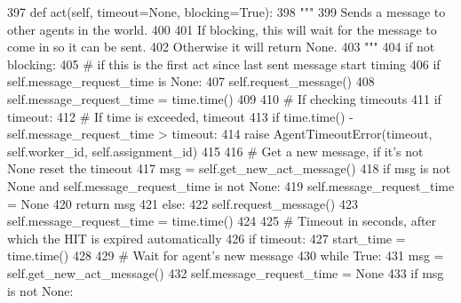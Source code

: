 \begin{DoxyCode}
397     \textcolor{keyword}{def }act(self, timeout=None, blocking=True):
398         \textcolor{stringliteral}{"""}
399 \textcolor{stringliteral}{        Sends a message to other agents in the world.}
400 \textcolor{stringliteral}{}
401 \textcolor{stringliteral}{        If blocking, this will wait for the message to come in so it can be sent.}
402 \textcolor{stringliteral}{        Otherwise it will return None.}
403 \textcolor{stringliteral}{        """}
404         \textcolor{keywordflow}{if} \textcolor{keywordflow}{not} blocking:
405             \textcolor{comment}{# if this is the first act since last sent message start timing}
406             \textcolor{keywordflow}{if} self.message\_request\_time \textcolor{keywordflow}{is} \textcolor{keywordtype}{None}:
407                 self.request\_message()
408                 self.message\_request\_time = time.time()
409 
410             \textcolor{comment}{# If checking timeouts}
411             \textcolor{keywordflow}{if} timeout:
412                 \textcolor{comment}{# If time is exceeded, timeout}
413                 \textcolor{keywordflow}{if} time.time() - self.message\_request\_time > timeout:
414                     \textcolor{keywordflow}{raise} AgentTimeoutError(timeout, self.worker\_id, self.assignment\_id)
415 
416             \textcolor{comment}{# Get a new message, if it's not None reset the timeout}
417             msg = self.get\_new\_act\_message()
418             \textcolor{keywordflow}{if} msg \textcolor{keywordflow}{is} \textcolor{keywordflow}{not} \textcolor{keywordtype}{None} \textcolor{keywordflow}{and} self.message\_request\_time \textcolor{keywordflow}{is} \textcolor{keywordflow}{not} \textcolor{keywordtype}{None}:
419                 self.message\_request\_time = \textcolor{keywordtype}{None}
420             \textcolor{keywordflow}{return} msg
421         \textcolor{keywordflow}{else}:
422             self.request\_message()
423             self.message\_request\_time = time.time()
424 
425             \textcolor{comment}{# Timeout in seconds, after which the HIT is expired automatically}
426             \textcolor{keywordflow}{if} timeout:
427                 start\_time = time.time()
428 
429             \textcolor{comment}{# Wait for agent's new message}
430             \textcolor{keywordflow}{while} \textcolor{keyword}{True}:
431                 msg = self.get\_new\_act\_message()
432                 self.message\_request\_time = \textcolor{keywordtype}{None}
433                 \textcolor{keywordflow}{if} msg \textcolor{keywordflow}{is} \textcolor{keywordflow}{not} \textcolor{keywordtype}{None}:

\end{DoxyCode}
